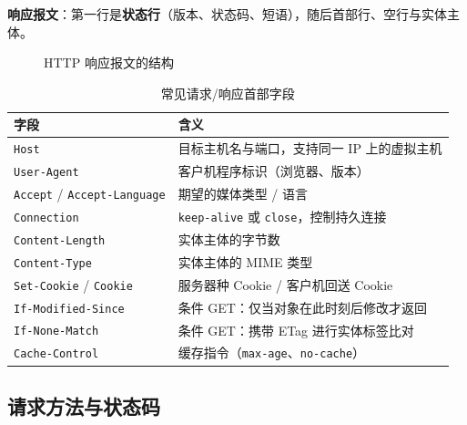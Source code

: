 \noindent\textbf{响应报文}：第一行是\textbf{状态行}（版本、状态码、短语），随后首部行、空行与实体主体。

\begin{figure}[H]
\centering
{}
\caption{HTTP 响应报文的结构}
\label{fig:http_response}
\end{figure}

\begin{table}[H]
\centering
\caption{常见请求/响应首部字段}
\begin{tabulary}{\textwidth}{@{}LL@{}}
\toprule
\textbf{字段} & \textbf{含义} \\
\midrule
\texttt{Host} & 目标主机名与端口，支持同一 IP 上的虚拟主机 \\
\texttt{User-Agent} & 客户机程序标识（浏览器、版本） \\
\texttt{Accept} / \texttt{Accept-Language} & 期望的媒体类型 / 语言 \\
\texttt{Connection} & \texttt{keep-alive} 或 \texttt{close}，控制持久连接 \\
\texttt{Content-Length} & 实体主体的字节数 \\
\texttt{Content-Type} & 实体主体的 MIME 类型 \\
\texttt{Set-Cookie} / \texttt{Cookie} & 服务器种 Cookie / 客户机回送 Cookie \\
\texttt{If-Modified-Since} & 条件 GET：仅当对象在此时刻后修改才返回 \\
\texttt{If-None-Match} & 条件 GET：携带 ETag 进行实体标签比对 \\
\texttt{Cache-Control} & 缓存指令（\texttt{max-age}、\texttt{no-cache}） \\
\bottomrule
\end{tabulary}
\end{table}

\subsection{请求方法与状态码}

